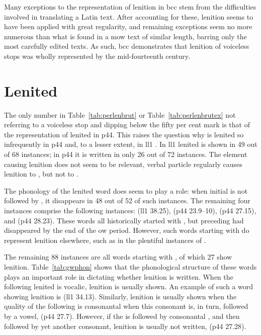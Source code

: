 Many exceptions to the representation of lenition in \gls{bcc} stem from the difficulties involved in translating a Latin text.
After accounting for these, lenition seems to have been applied with great regularity, and remaining exceptions seem no more numerous than what is found in a \gls{mow} text of similar length, barring only the most carefully edited texts.
As such, \gls{bcc} demonstrates that lenition of voiceless stops was wholly represented by the mid-fourteenth century.

\section{Lenited }
\label{sec:lenited-mwg}
The only number in Table~\ref{tab:perlenbrut} or Table~\ref{tab:perlenbrutex} not referring to a voiceless stop and dipping below the fifty per cent mark is that of the representation of lenited  in \gls{p44}.
This raises the question why  is lenited so infrequently in \gls{p44} and, to a lesser
extent, in \gls{ll1} .  In \gls{ll1}
lenited  is shown in 49 out of 68 instances; in \gls{p44} it
is written in  only 26 out of 72 instances.  The element causing lenition
does not seem to be relevant, \eg verbal particle  regularly
causes lenition to , but not to .

The phonology of the lenited word does seem to play a role: when
initial  is not followed by , it disappears in 48 out of
52 of such instances. The remaining four instances comprise the following
instances:  (\gls{ll1} 38.25),
 (\gls{p44} 23.9--10), 
(\gls{p44} 27.15), and  (\gls{p44}
28.23). These words all historically started with , but  \mw{\cw}
preceding  had disappeared by the end of the \gls{ow} period. However, such words
starting with  do represent lenition elsewhere, such as in the
plentiful instances of .

The remaining 88 instances are all words starting with , of which 27 show lenition.
Table~\ref{tab:gwphon} shows that the phonological structure of these words plays an important role in dictating whether lenition is written.
When the  following lenited  is vocalic, lenition is usually shown.
An example of such a word showing lenition is  (\gls{ll1} 34.13).
Similarly, lenition is usually shown when the quality of the following \mw{\cw} is consonantal when this consonant is, in turn, followed by a vowel, \eg {} (\gls{p44} 27.7).
However, if the  is followed by consonantal \mw{\cw}, and then followed by yet another consonant, lenition is usually not written, \eg {} (\gls{p44} 27.28).

